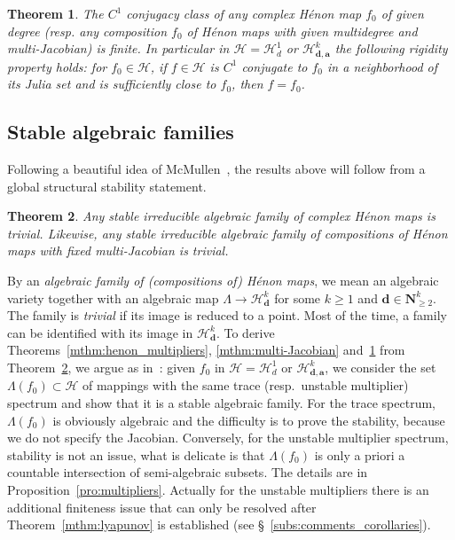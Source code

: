 \documentclass[oneside, 12pt]{amsart}
\newcommand{\N}{\mathbf{N}}
\theoremstyle{plain}
\newtheorem{mthm}{Theorem}
\theoremstyle{definition}
\numberwithin{equation}{section}       %
\numberwithin{equation}{section}       %
\begin{document}
\begin{mthm}\label{mthm:C1}
The $C^1$ conjugacy class of any complex Hénon map $f_0$ of given degree  (resp. any composition $f_0$ of Hénon maps 
with given multidegree and multi-Jacobian) is finite.  
In particular in $\mathcal H = \mathcal H^1_d$ or $\mathcal H^k_{\mathbf{d}, \mathbf{a}}$ the following rigidity property holds:  for $f_0\in \mathcal H$,
  if  $f\in \mathcal H$ is $C^1$ conjugate to $f_0$ in a neighborhood of its Julia set 
and is sufficiently close to $f_0$, then $f=f_0$.   
\end{mthm}
  


\subsection{Stable algebraic families}
Following a beautiful idea of 
McMullen~\cite{mcm:algorithms}, 
the results above
will follow from a global structural stability statement.  

\begin{mthm}\label{mthm:stable}
Any stable irreducible algebraic family of complex Hénon maps is trivial. Likewise, any stable 
irreducible  algebraic family of compositions of Hénon maps with fixed multi-Jacobian is trivial. 
\end{mthm}

 By an \emph{algebraic  family of (compositions of) Hénon maps}, we mean an algebraic variety together with an algebraic map $\Lambda\to \mathcal H^k_{\mathbf d}$  for some $k\geq 1$ and $\mathbf d\in \N^k_{\geq 2}$.
 The family is \emph{trivial} if its image  is reduced to a point. Most of the time, a family can be identified with its image in $\mathcal H^k_{\mathbf d}$. 
To derive Theorems~\ref{mthm:henon_multipliers}, \ref{mthm:multi-Jacobian} and~\ref{mthm:C1} from 
Theorem~\ref{mthm:stable}, we  argue as in~\cite{mcm:algorithms}: 
given $f_0$ in $\mathcal H  = \mathcal H^1_d$ or $\mathcal H^k_{\mathbf d, \mathbf a}$, 
  we consider the set $\Lambda(f_0)\subset \mathcal H$ 
  of mappings with the same trace  (resp.\  unstable multiplier) 
  spectrum and show that it is a stable algebraic family. For the trace spectrum, $\Lambda(f_0)$ is obviously algebraic and 
  the difficulty is to prove the stability, because we do not specify    the Jacobian. 
 Conversely, for the unstable multiplier spectrum, stability is not an issue, what is delicate 
  is that $\Lambda(f_0)$ is only a priori a countable 
 intersection of semi-algebraic subsets. 
  The details are in Proposition~\ref{pro:multipliers}.
Actually for the   unstable multipliers  there is an additional finiteness issue that  
 can only be resolved   after Theorem~\ref{mthm:lyapunov} is established (see \S~\ref{subs:comments_corollaries}). 
\end{document}
